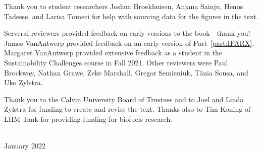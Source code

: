 Thank you to student researchers Joshua Broekhuisen, Anjana Sainju, 
Henos Tadesse, and Larisa Tomeci
for help with sourcing data for the figures in the text. 

Serveral reviewers provided feedback on early versions to the book---thank you!
James VanAntwerp provided feedback on an early version of Part~\ref{part:IPARX}.
Margaret VanAntwerp provided extensive feedback as a student in the
Sustainability Challenges course in Fall 2021.
Other reviewers were Paul Brockway, Nathan Grawe, Zeke Marshall,
Gregor Semieniuk, T\^{a}nia Sousa, and Uko Zylstra.


Thank you to the Calvin University Board of Trustees and 
to Joel and Linda Zylstra
for funding to create and revise the text.
Thanks also to Tim Koning of LHM Tank for providing funding for biofuels research.



\vspace*{2pc}
\noindent\AUTHORS\\
\noindent January 2022
 
\clearpage

\blankpage
